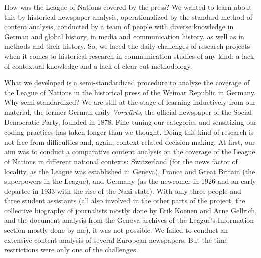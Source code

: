 \documentclass{tufte-handout}
\begin{document}
How was the League of Nations covered by the press? We wanted to learn
about this by historical newspaper analysis, operationalized by the
standard method of content analysis, conducted by a team of people with
diverse knowledge in German and global history, in media and
communication history, as well as in methods and their history. So, we
faced the daily challenges of research projects when it comes to
historical research in communication studies of any kind: a lack of
contextual knowledge and a lack of clear-cut methodology.

What we developed is a semi-standardized procedure to analyze the
coverage of the League of Nations in the historical press of the Weimar
Republic in Germany. Why semi-standardized? We are still at the stage of
learning inductively from our material, the former German daily
\emph{Vorwärts}, the official newspaper of the Social Democratic Party,
founded in 1878. Fine-tuning our categories and sensitizing our coding
practices has taken longer than we thought. Doing this kind of research
is not free from difficulties and, again, context-related
decision-making. At first, our aim was to conduct a comparative content
analysis on the coverage of the League of Nations in different national
contexts: Switzerland (for the news factor of locality, as the League
was established in Geneva), France and Great Britain (the superpowers in
the League), and Germany (as the newcomer in 1926 and an early departee
in 1933 with the rise of the Nazi state). With only three people and
three student assistants (all also involved in the other parts of the
project, the collective biography of journalists mostly done by Erik
Koenen and Arne Gellrich, and the document analysis from the Geneva
archives of the League's Information section mostly done by me), it was
not possible. We failed to conduct an extensive content analysis of
several European newspapers. But the time restrictions were only one of
the challenges.
\end{document}
